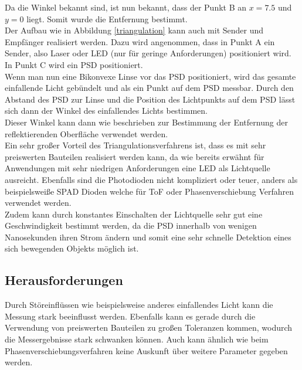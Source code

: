 Da die Winkel bekannt sind, ist nun bekannt, dass der Punkt B an $x = 7.5$ und $y = 0$ liegt. Somit wurde die Entfernung bestimmt.\\
Der Aufbau wie in Abbildung \ref{triangulation} kann auch mit Sender und Empfänger realisiert werden. Dazu wird angenommen, dass in Punkt A ein Sender, also Laser oder \ac{LED} (nur für geringe Anforderungen) positioniert wird. In Punkt C wird ein \ac{PSD} positioniert.\\
Wenn man nun eine Bikonvexe Linse vor das \ac{PSD} positioniert, wird das gesamte einfallende Licht gebündelt und als ein Punkt auf dem \ac{PSD} messbar.
Durch den Abstand des \ac{PSD} zur Linse und die Position des Lichtpunkts auf dem \ac{PSD} lässt sich dann der Winkel des einfallendes Lichts bestimmen.\\
Dieser Winkel kann dann wie beschrieben zur Bestimmung der Entfernung der reflektierenden Oberfläche verwendet werden. \\
Ein sehr großer Vorteil des Triangulationsverfahrens ist, dass es mit sehr preiswerten Bauteilen realisiert werden kann, da wie bereits erwähnt für Anwendungen mit sehr niedrigen Anforderungen eine \ac{LED} als Lichtquelle ausreicht. Ebenfalls sind die Photodioden nicht kompliziert oder teuer, anders als beispielsweiße \ac{SPAD} Dioden welche für \ac{ToF} oder Phasenverschiebung Verfahren verwendet werden.\\
Zudem kann durch konstantes Einschalten der Lichtquelle sehr gut eine Geschwindigkeit bestimmt werden, da die \ac{PSD} innerhalb von wenigen Nanosekunden ihren Strom ändern und somit eine sehr schnelle Detektion eines sich bewegenden Objekts möglich ist. \cite{triangulation}\cite{psd}
\subsection{Herausforderungen}
Durch Störeinflüssen wie beispielsweise anderes einfallendes Licht kann die Messung stark beeinflusst werden. Ebenfalls kann es gerade durch die Verwendung von preiswerten Bauteilen zu großen Toleranzen kommen, wodurch die Messergebnisse stark schwanken können. Auch kann ähnlich wie beim Phasenverschiebungsverfahren keine Auskunft über weitere Parameter gegeben werden. 